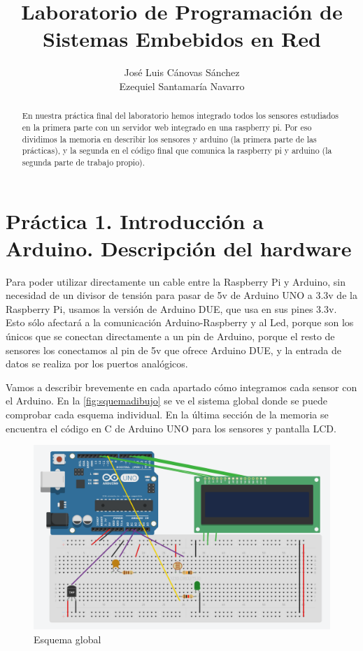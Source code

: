 \documentclass[]{article}
\title{Laboratorio de Programación de Sistemas Embebidos en Red}
\author{José Luis Cánovas Sánchez\\Ezequiel Santamaría Navarro}
\begin{document}
\maketitle


\begin{abstract}
En nuestra práctica final del laboratorio hemos integrado todos los sensores estudiados en la primera parte con un servidor web integrado en una raspberry pi. Por eso dividimos la memoria en describir los sensores y arduino (la primera parte de las prácticas), y la segunda en el código final que comunica la raspberry pi y arduino (la segunda parte de trabajo propio).
\end{abstract}

\tableofcontents

\clearpage

\section{Práctica 1. Introducción a Arduino. Descripción del hardware}
Para poder utilizar directamente un cable entre la Raspberry Pi y Arduino, sin necesidad de un divisor de tensión para pasar de 5v de Arduino UNO a 3.3v de la Raspberry Pi, usamos la versión de Arduino DUE, que usa en sus pines 3.3v. Esto sólo afectará a la comunicación Arduino-Raspberry y al Led, porque son los únicos que se conectan directamente a un pin de Arduino, porque el resto de sensores los conectamos al pin de 5v que ofrece Arduino DUE, y la entrada de datos se realiza por los puertos analógicos.

Vamos a describir brevemente en cada apartado cómo integramos cada sensor con el Arduino. En la  \autoref{fig:squemadibujo} se ve el sistema global donde se puede comprobar cada esquema individual. En la última sección de la memoria se encuentra el código en C de Arduino UNO para los sensores y pantalla LCD.

\begin{figure}[H]
	\centering
	\includegraphics[width=1\linewidth]{images/squemaDibujo.PNG}
	\caption{Esquema global}
	\label{fig:squemadibujo}
\end{figure}
\end{document}
